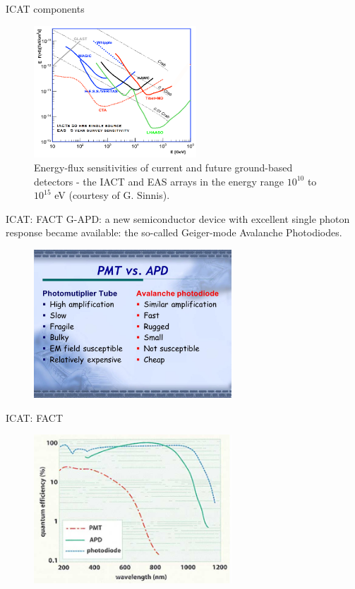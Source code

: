 \documentclass{beamer}
\begin{document}
\begin{frame}{ICAT components}
	\begin{figure}[h]
		\includegraphics[width=230px]{snesitivities.png}
		\caption{Energy-flux sensitivities of current and future ground-based detectors - the IACT and EAS arrays in the energy range $10^{10}$ to $10^{15}$ eV (courtesy of G. Sinnis).}
	\end{figure}
\end{frame}


\begin{frame}{ICAT: FACT}
	G-APD: a new semiconductor device with excellent single photon response became available: the so-called Geiger-mode Avalanche Photodiodes.
	\begin{figure}[h]
		\includegraphics[width=280px]{PMTvsAPD.jpg}
	\end{figure}
\end{frame}


\begin{frame}{ICAT: FACT}
	\begin{figure}[h]
		\includegraphics[width=280px]{DetectorsGuidepost.jpg}
	\end{figure}
\end{frame}
\end{document}
